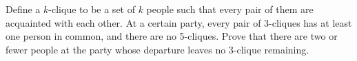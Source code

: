 Define a $k$-clique to be a set of $k$ people such that every pair of them are acquainted with each other. At a certain party, every pair of 3-cliques has at least one person in common, and there are no 5-cliques. Prove that there are two or fewer people at the party whose departure leaves no 3-clique remaining.
